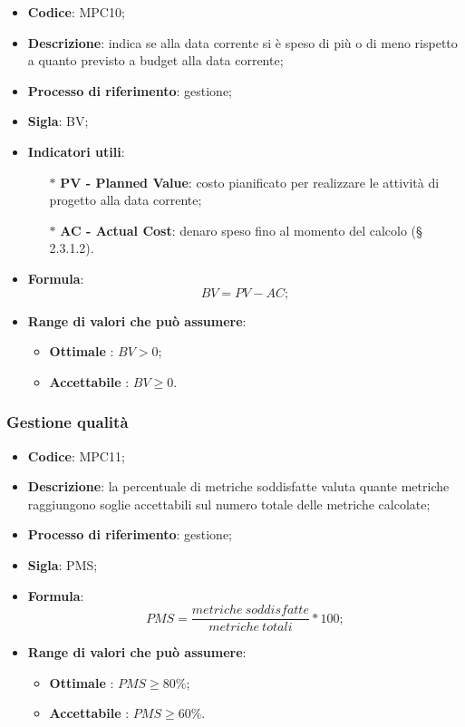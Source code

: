 \vspace{-1cm}
\begin{itemize}
	\item \textbf{Codice}: MPC10;
	\item \textbf{Descrizione}: indica se alla data corrente si è speso di più o di meno rispetto a quanto previsto a budget alla data corrente;
	\item \textbf{Processo di riferimento}: gestione;
	\item \textbf{Sigla}: BV;
	\item \textbf{Indicatori utili}: 
		\begin{itemize}
			\item[$\ast$] \textbf{PV - Planned Value}: costo pianificato per realizzare le attività di progetto alla data corrente;
			\item[$\ast$] \textbf{AC - Actual Cost}: denaro speso fino al momento del calcolo (§ 2.3.1.2).
		\end{itemize}
	\item \textbf{Formula}: \[ BV = PV - AC;\]
	\item \textbf{Range di valori che può assumere}: 
		\begin{itemize}
			\item \textbf{Ottimale} : $BV > 0$;
			\item \textbf{Accettabile} : $BV \geq 0$.
		\end{itemize}
\end{itemize}

\subsubsection{Gestione qualità}
\vspace{-1cm}
\begin{itemize}
	\item \textbf{Codice}: MPC11;
	\item \textbf{Descrizione}: la percentuale di metriche soddisfatte valuta quante metriche raggiungono soglie accettabili sul numero totale delle metriche calcolate;
	\item \textbf{Processo di riferimento}: gestione;
	\item \textbf{Sigla}: PMS;
	\item \textbf{Formula}: \[ PMS = \frac{metriche \ soddisfatte}{metriche \ totali} \ast 100;\]
	\item \textbf{Range di valori che può assumere}: 
		\begin{itemize}
			\item \textbf{Ottimale} : $PMS \geq 80 \%$;
			\item \textbf{Accettabile} : $PMS \geq 60 \%$.
		\end{itemize}
\end{itemize}